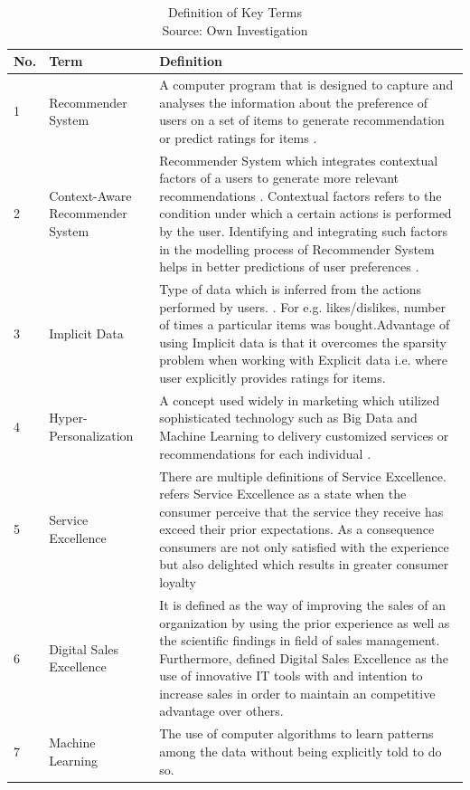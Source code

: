 \begin{table}
\begin{tabular}{ |m{0.5cm}| m{3cm} | m{10cm}| } 
\hline 
No. & Term & Definition \\ 
\hline \hline
1 & Recommender System & A computer program that is designed to capture and analyses the information about the preference of users on a set of items to generate recommendation or predict ratings for items \autocite[1]{SchaferJoshephKonstan1999}.   \\ 
\hline
2 & Context-Aware Recommender System & Recommender System which integrates contextual factors of a users to generate more relevant recommendations \autocite[67]{Adomavicius2011}. Contextual factors refers to the condition under which a certain actions is performed by the user. Identifying and integrating such factors in the modelling process of Recommender System helps in better predictions of user preferences \autocite[68]{Adomavicius2011}. \\ 
\hline
3 & Implicit Data & Type of data which is inferred from the actions performed by users.   \autocite[2]{oard1998implicit}. For e.g. likes/dislikes, number of times a particular items was bought.Advantage of using Implicit data is that it overcomes the sparsity problem when working with Explicit data i.e. where user explicitly provides ratings for items. \\ 
\hline

4 & Hyper-Personalization & A concept used widely in marketing which utilized sophisticated technology such as Big Data and Machine Learning to delivery customized services or recommendations for each individual \autocite[5]{CapgeminiconsultingESSECBusinessSchool2016}. \\
\hline

5 & Service Excellence & There are multiple definitions of Service Excellence. \textcite[]{Horwitz1996} refers Service Excellence as a state when the consumer perceive that the service they receive has exceed their prior expectations. As a consequence consumers are not only satisfied with the experience but also delighted which results in greater consumer loyalty \autocite[448]{Gouthier2012}\\
\hline
6 & Digital Sales Excellence & It is defined as the way of improving the sales of an organization by using the prior experience as well as the scientific findings in field of sales management. Furthermore, \textcite[5]{Binckebanck2016} defined Digital Sales Excellence as the use of innovative IT tools with and intention to increase sales in order to maintain an competitive advantage over others.\\
\hline
7 & Machine Learning & The use of computer algorithms to learn patterns among the data without being explicitly told to do so.\\
\hline
\end{tabular}
\label{table:definition}
\caption{Definition of Key Terms \\
Source: Own Investigation}
\end{table}


